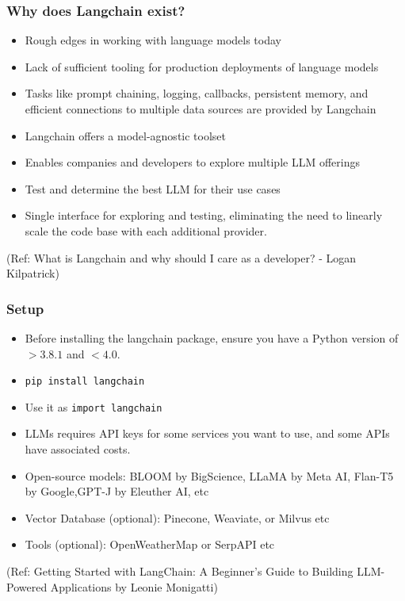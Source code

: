 \begin{frame}[fragile]\frametitle{Why does Langchain exist?}

\begin{itemize}
\item Rough edges in working with language models today
\item Lack of sufficient tooling for production deployments of language models
\item Tasks like prompt chaining, logging, callbacks, persistent memory, and efficient connections to multiple data sources are provided by Langchain
\item Langchain offers a model-agnostic toolset
\item Enables companies and developers to explore multiple LLM offerings
\item Test and determine the best LLM for their use cases
\item Single interface for exploring and testing, eliminating the need to linearly scale the code base with each additional provider.
\end{itemize}

{\tiny (Ref: What is Langchain and why should I care as a developer? - Logan Kilpatrick)}

\end{frame}

\begin{frame}[fragile]\frametitle{Setup}

\begin{itemize}
\item Before installing the langchain package, ensure you have a Python version of $> 3.8.1$ and $<4.0$.
\item \lstinline|pip install langchain|
\item Use it as \lstinline|import langchain|
\item LLMs requires API keys for some services you want to use, and some APIs have associated costs.
\item Open-source models: BLOOM by BigScience, LLaMA by Meta AI, Flan-T5 by Google,GPT-J by Eleuther AI, etc
\item Vector Database (optional):  Pinecone, Weaviate, or Milvus etc
\item Tools (optional): OpenWeatherMap or SerpAPI etc
\end{itemize}

{\tiny (Ref: Getting Started with LangChain: A Beginner’s Guide to Building LLM-Powered Applications by Leonie Monigatti)}

\end{frame}

